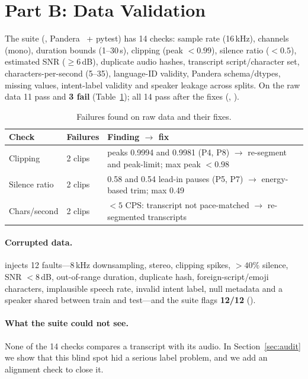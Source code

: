 \documentclass[sigconf,authordraft]{acmart}
\begin{document}
\section{Part B: Data Validation}\label{sec:valid}
The suite (, Pandera~\cite{Bantilan2020} + pytest) has 14 checks: sample rate (16\,kHz), channels (mono), duration bounds (1--30\,s), clipping (peak $<0.99$), silence ratio ($<0.5$), estimated SNR ($\ge6$\,dB), duplicate audio hashes, transcript script/character set, characters-per-second (5--35), language-ID validity, Pandera schema/dtypes, missing values, intent-label validity and speaker leakage across splits.
On the raw data 11 pass and \textbf{3 fail} (Table~\ref{tab:valid}); all 14 pass after the fixes (, ).

\begin{table}[htbp]
\caption{Failures found on raw data and their fixes.}\label{tab:valid}
\begin{tabular}{p{1.55cm}p{1.2cm}p{4.8cm}}
\toprule
Check & Failures & Finding $\to$ fix \\ \midrule
Clipping & 2 clips & peaks 0.9994 and 0.9981 (P4, P8) $\to$ re-segment and peak-limit; max peak $<0.98$ \\
Silence ratio & 2 clips & 0.58 and 0.54 lead-in pauses (P5, P7) $\to$ energy-based trim; max 0.49 \\
Chars/second & 2 clips & $<5$ CPS: transcript not pace-matched $\to$ re-segmented transcripts \\ \bottomrule
\end{tabular}
\end{table}

\paragraph{Corrupted data.}
 injects 12 faults---8\,kHz downsampling, stereo, clipping spikes, $>40\%$ silence, SNR $<8$\,dB, out-of-range duration, duplicate hash, foreign-script/emoji characters, implausible speech rate, invalid intent label, null metadata and a speaker shared between train and test---and the suite flags \textbf{12/12} ().
\paragraph{What the suite could not see.}
None of the 14 checks compares a transcript with its audio. In Section~\ref{sec:audit} we show that this blind spot hid a serious label problem, and we add an alignment check to close it.
\end{document}
